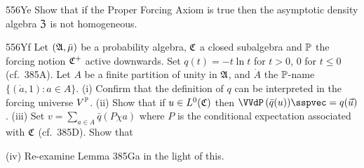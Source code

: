 {\spheader 556Ye Show that if the Proper Forcing Axiom is true then
the asymptotic density algebra $\frak Z$ is not homogeneous.   

\spheader 556Yf Let $(\frak A,\bar\mu)$ be a probability
algebra, $\frak C$ a closed subalgebra and $\Bbb P$ the forcing notion
$\frak C^+$ active downwards.   Set $q(t)=-t\ln t$ for $t>0$,
$0$ for $t\le 0$ (cf.\ 385A).
Let $A$ be a finite partition of unity in $\frak A$, and $\dot A$ the
$\Bbb P$-name $\{(\dot a,1):a\in A\}$.
(i) Confirm that the definition of
$q$ can be interpreted in the forcing universe $V^{\Bbb P}$.
(ii) Show
that if $u\in L^0(\frak C)$ then $\VVdP\,(\bar q(u))\sspvec=q(\vec u)$.
(iii) Set $v=\sum_{a\in A}\bar q(P\chi a)$ where $P$ is the conditional
expectation associated with $\frak C$ (cf.\ 385D).   Show that


\noindent(iv) Re-examine Lemma 385Ga in the light of this.
}%

